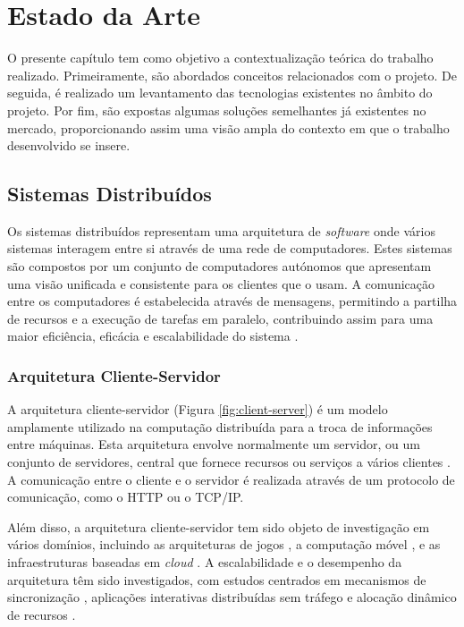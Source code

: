 \chapter{Estado da Arte}
\label{sec:2-EstadoArte}

O presente capítulo tem como objetivo a contextualização teórica do trabalho realizado. 
Primeiramente, são abordados conceitos relacionados com o projeto. De seguida, é realizado um 
levantamento das tecnologias existentes no âmbito do projeto. Por fim, são expostas algumas 
soluções semelhantes já existentes no mercado, proporcionando assim uma visão ampla do contexto em 
que o trabalho desenvolvido se insere.

\section{Sistemas Distribuídos}

Os sistemas distribuídos representam uma arquitetura de \textit{software} onde vários sistemas 
interagem entre si através de uma rede de computadores. Estes sistemas são compostos por um conjunto 
de computadores autónomos que apresentam uma visão unificada e consistente para os clientes que o 
usam. A comunicação entre os computadores é estabelecida através de mensagens, permitindo a partilha 
de recursos e a execução de tarefas em paralelo, contribuindo assim para uma maior eficiência,
eficácia e escalabilidade do sistema \cite{verissimo2001distributed}.

\subsection{Arquitetura Cliente-Servidor}

A arquitetura cliente-servidor (Figura \ref{fig:client-server}) é um modelo amplamente utilizado na 
computação distribuída para a troca de informações entre máquinas. Esta arquitetura envolve 
normalmente um servidor, ou um conjunto de servidores, central que fornece recursos ou serviços a 
vários clientes \cite{clientserver2019}. A comunicação entre o cliente e o servidor é realizada 
através de um protocolo de comunicação, como o HTTP ou o TCP/IP.

Além disso, a arquitetura cliente-servidor tem sido objeto de investigação em vários domínios, 
incluindo as arquiteturas de jogos \cite{clientserver2018}, a computação móvel \cite{clientserver1999},
e as infraestruturas baseadas em \textit{cloud} \cite{clientserver2012}. A escalabilidade e o 
desempenho da arquitetura têm sido investigados, com estudos centrados em mecanismos de sincronização
\cite{clientserver2004}, aplicações interativas distribuídas sem tráfego \cite{clientserver2015} e
alocação dinâmico de recursos \cite{clientserver2012}.

